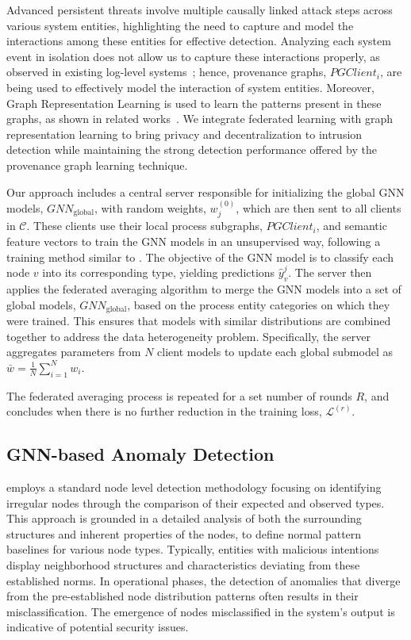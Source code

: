 Advanced persistent threats involve multiple causally linked attack steps across various system entities, highlighting the need to capture and model the interactions among these entities for effective detection. Analyzing each system event in isolation does not allow us to capture these interactions properly, as observed in existing log-level systems~\cite{deeplog2017,liu2019log2vec,xia2019loggan}; hence, provenance graphs, \( PGClient_{i} \), are being used to effectively model the interaction of system entities. Moreover, Graph Representation Learning is used to learn the patterns present in these graphs, as shown in related works~\cite{flash2024,cheng2023kairos,jia2023magic}. We integrate federated learning with graph representation learning to bring privacy and decentralization to intrusion detection while maintaining the strong detection performance offered by the provenance graph learning technique.

Our approach includes a central server responsible for initializing the global GNN models, \({GNN}_{\text{global}}\), with random weights, \( w_j^{(0)} \), which are then sent to all clients in \( \mathcal{C} \). These clients use their local process subgraphs, \( PGClient_{i} \), and semantic feature vectors to train the GNN models in an unsupervised way, following a training method similar to \flash. The objective of the GNN model is to classify each node \( v \) into its corresponding type, yielding predictions \(\hat{y}_v^j\). The server then applies the federated averaging algorithm to merge the GNN models into a set of global models, \({GNN}_{\text{global}}\), based on the process entity categories on which they were trained. This ensures that models with similar distributions are combined together to address the data heterogeneity problem. Specifically, the server aggregates parameters from \( N \) client models to update each global submodel as \(\bar{w} = \frac{1}{N} \sum_{i=1}^{N} w_i\).

The federated averaging process is repeated for a set number of rounds \( R \), and concludes when there is no further reduction in the training loss, \(\mathcal{L}^{(r)}\). 

\subsection{GNN-based Anomaly Detection}
\label{sys:anomaly_detection}

\Sys employs a standard node level detection methodology focusing on identifying irregular nodes through the comparison of their expected and observed types. This approach is grounded in a detailed analysis of both the surrounding structures and inherent properties of the nodes, to define normal pattern baselines for various node types. Typically, entities with malicious intentions display neighborhood structures and characteristics deviating from these established norms. In operational phases, the detection of anomalies that diverge from the pre-established node distribution patterns often results in their misclassification. The emergence of nodes misclassified in the system's output is indicative of potential security issues.

